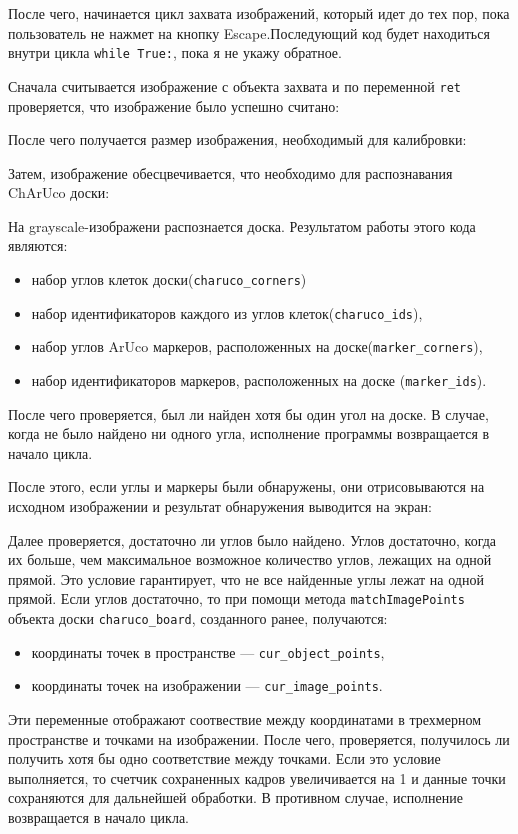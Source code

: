 \documentclass[12pt, a4paper]{article}
\begin{document}
После чего, начинается цикл захвата изображений, который идет до тех пор, пока
пользователь не нажмет на кнопку Escape.Последующий код будет
находиться внутри цикла \texttt{while True:}, пока я не укажу обратное.
\par
Сначала считывается изображение с объекта захвата и по переменной
\texttt{ret} проверяется, что изображение было успешно считано:

После чего получается размер изображения, необходимый для калибровки:

Затем, изображение обесцвечивается, что необходимо для распознавания ChArUco доски:

На grayscale-изображени распознается доска. Результатом работы этого кода
являются: 
\begin{itemize}
  \item набор углов клеток доски(\texttt{charuco\_corners})
  \item набор идентификаторов каждого из углов клеток(\texttt{charuco\_ids}),
  \item набор углов ArUco маркеров, расположенных на доске(\texttt{marker\_corners}),
  \item набор идентификаторов маркеров, расположенных на доске (\texttt{marker\_ids}).
\end{itemize}
После чего проверяется, был ли найден хотя бы один угол на доске.
В случае, когда не было найдено ни одного угла, исполнение программы
возвращается в начало цикла.

После этого, если углы и маркеры были обнаружены, они отрисовываются на
исходном изображении и результат обнаружения выводится на экран:

Далее проверяется, достаточно ли углов было найдено. 
Углов достаточно, когда их больше, чем максимальное возможное количество углов,
лежащих на одной прямой. Это условие гарантирует, что не все найденные углы
лежат на одной прямой. Если углов достаточно, то при помощи метода
\texttt{matchImagePoints} объекта доски \texttt{charuco\_board}, созданного
ранее, получаются:
\begin{itemize}
  \item координаты точек в пространстве --- \texttt{cur\_object\_points}, 
  \item координаты точек на изображении --- \texttt{cur\_image\_points}.
\end{itemize}
Эти переменные отображают соотвествие между координатами в трехмерном
пространстве и точками на изображении.
После чего, проверяется, получилось ли получить хотя бы одно соответствие между
точками. Если это условие выполняется, то счетчик сохраненных кадров
увеличивается на 1 и данные точки сохраняются для дальнейшей обработки. В
противном случае, исполнение возвращается в начало цикла.
\end{document}
